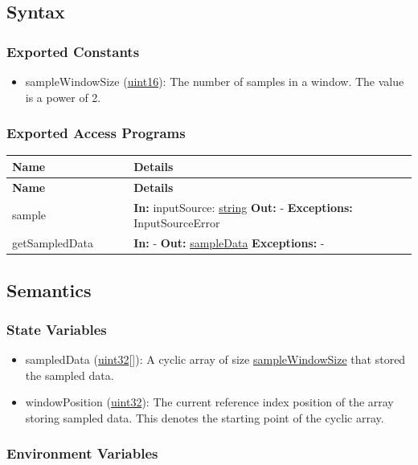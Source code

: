 \documentclass[12pt, titlepage]{article}
\newenvironment{apitable}{%
\begin{center}
\begin{longtable}{|p{0.3\linewidth}|p{0.7\linewidth}|} 
\hline
\textbf{Name} & \textbf{Details} \\
\hline
\endfirsthead
\hline
\textbf{Name} & \textbf{Details} \\
\hline
\endhead
\hline
\endfoot
\hline
\endlastfoot
}{%
\end{longtable}
\end{center}
}
\newcommand{\apifunc}[4]{%
#1 & 
\textbf{In:} #2 \newline
\textbf{Out:} #3 \newline
\textbf{Exceptions:} #4 \\
\hline
}
\begin{document}
\subsection{Syntax}

\subsubsection{Exported Constants}

\begin{itemize}
  \item sampleWindowSize (\hyperref[generic:uint16]{uint16}):
    \label{var:sampleWindowSize}
    The number of samples in a window. The value is a power of 2.
\end{itemize}

\subsubsection{Exported Access Programs}
\begin{apitable}
  \apifunc{sample}
    {inputSource: \hyperref[generic:string]{string}}
    {-}
    {InputSourceError}
  \apifunc{getSampledData}{-}{\hyperref[var:sampleData]{sampleData}}{-}
\end{apitable}

\subsection{Semantics}

\subsubsection{State Variables}

\begin{itemize}
  \item sampledData (\hyperref[generic:uint32]{uint32}[]):
    \label{var:sampleData}  
    A cyclic array of size \hyperref[var:sampleWindowSize]{sampleWindowSize}
    that stored the sampled data.
  \item windowPosition (\hyperref[generic:uint32]{uint32}):
    \label{var:windowPosition}  
    The current reference index position of the array storing sampled data. This
    denotes the starting point of the cyclic array. 
\end{itemize}

\subsubsection{Environment Variables}
\end{document}

